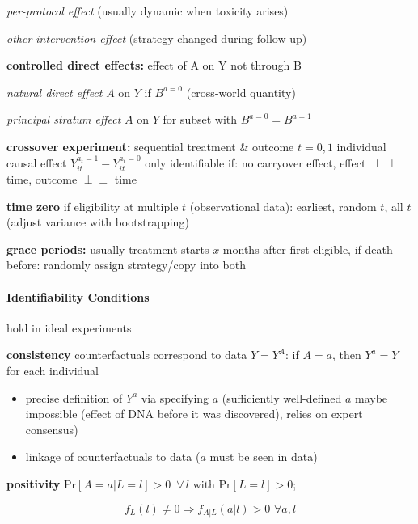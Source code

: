 \documentclass[8pt,twoside]{extarticle}
\renewcommand{\indent}{\hspace*{15pt}}
\newcommand{\indep}{\perp \!\!\! \perp}
\begin{document}
\begin{multicols}{2}
\indent \textit{per-protocol effect} (usually dynamic when toxicity arises)

\indent \textit{other intervention effect} (strategy changed during follow-up)


 \textbf{controlled direct effects:} effect of A on Y not through B

\indent \textit{natural direct effect}  $A$ on $Y$ if $B^{a=0}$ (cross-world quantity)

\indent \textit{principal stratum effect} $A$ on $Y$ for subset with $B^{a=0} = B^{a=1}$

 \textbf{crossover experiment:} sequential treatment \& outcome $t{=}0,1$
\newline
individual causal effect $Y_{it}^{a_t=1} - Y_{it}^{a_t=0}$ only identifiable if: no carryover effect, effect $\indep$ time, outcome $\indep$ time

 \textbf{time zero} if eligibility at multiple $t$ (observational data):
earliest, random $t$, all $t$ (adjust variance with bootstrapping)

 \textbf{grace periods:} usually treatment starts $x$ months after first eligible, if death before: randomly assign strategy/copy into both




\paragraph{Identifiability Conditions} hold in ideal experiments

 \textbf{consistency} counterfactuals correspond to data $Y=Y^A$: \newline
 if $A=a$, then $Y^a=Y$ for each individual
 
\begin{itemize}[itemsep=0em, topsep=0pt, partopsep=0pt,parsep=0pt, leftmargin=1.5em]
\item precise definition of $Y^a$ via specifying $a$ (sufficiently well-defined $a$ maybe impossible (effect of DNA before it was discovered), relies on expert consensus)
\item linkage of counterfactuals to data ($a$ must be seen in data) 
\end{itemize}

 \textbf{positivity} $\mathrm{Pr}\left[A=a|L=l\right] >0 \,\,\, \forall \, l \text{ with } \mathrm{Pr}\left[L=l\right]>0$; \vspace{-1.8em}
 
 $$f_L(l)\neq 0 \Rightarrow f_{A|L}(a|l)>0 \,\, \forall a,l$$


\end{multicols}
\end{document}

